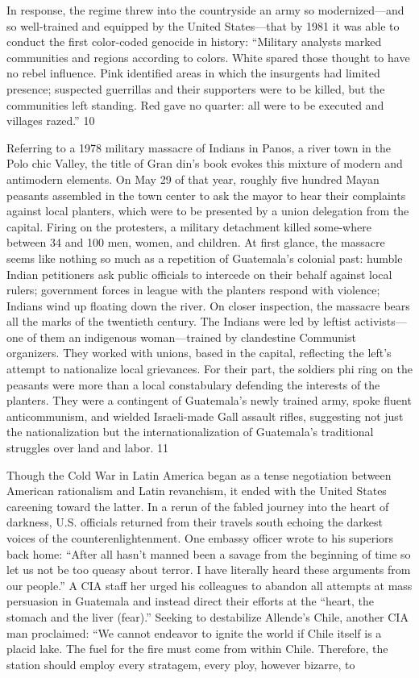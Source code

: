 In response, the regime threw into the countryside an army so modernized—and so well-trained and equipped by the United States—that by 1981 it was able to conduct the first color-coded genocide in history: “Military analysts marked communities and regions according to colors. White spared those thought to have no rebel influence. Pink identified areas in which the insurgents had limited presence; suspected guerrillas and their supporters were to be killed, but the communities left standing. Red gave no quarter: all were to be executed and villages razed.” {\color{blue} 10 } {\par} Referring to a 1978 military massacre of Indians in Panos, a river town in the Polo chic Valley, the title of Gran din’s book evokes this mixture of modern and antimodern elements. On May {\color{blue} 29 } of that year, roughly five hundred Mayan peasants assembled in the town center to ask the mayor to hear their complaints against local planters, which were to be presented by a union delegation from the capital. Firing on the protesters, a military detachment killed some-where between {\color{blue} 34 } and {\color{blue} 100 } men, women, and children. At first glance, the massacre seems like nothing so much as a repetition of Guatemala’s colonial past: humble Indian petitioners ask public officials to intercede on their behalf against local rulers; government forces in league with the planters respond with violence; Indians wind up floating down the river. On closer inspection, the massacre bears all the marks of the twentieth century. The Indians were led by leftist activists—one of them an indigenous woman—trained by clandestine Communist organizers. They worked with unions, based in the capital, reflecting the left’s attempt to nationalize local grievances. For their part, the soldiers phi ring on the peasants were more than a local constabulary defending the interests of the planters. They were a contingent of Guatemala’s newly trained army, spoke fluent anticommunism, and wielded Israeli-made Gall assault rifles, suggesting not just the nationalization but the internationalization of Guatemala’s traditional struggles over land and labor. {\color{blue} 11 } {\par} Though the Cold War in Latin America began as a tense negotiation between American rationalism and Latin revanchism, it ended with the United States careening toward the latter. In a rerun of the fabled journey into the heart of darkness, U.S. officials returned from their travels south echoing the darkest voices of the counterenlightenment. One embassy officer wrote to his superiors back home: “After all hasn’t manned been a savage from the beginning of time so let us not be too queasy about terror. I have literally heard these arguments from our people.” A CIA staff her urged his colleagues to abandon all attempts at mass persuasion in Guatemala and instead direct their efforts at the “heart, the stomach and the liver (fear).” Seeking to destabilize Allende’s Chile, another CIA man proclaimed: “We cannot endeavor to ignite the world if Chile itself is a placid lake. The fuel for the fire must come from within Chile. Therefore, the station should employ every stratagem, every ploy, however bizarre, to 